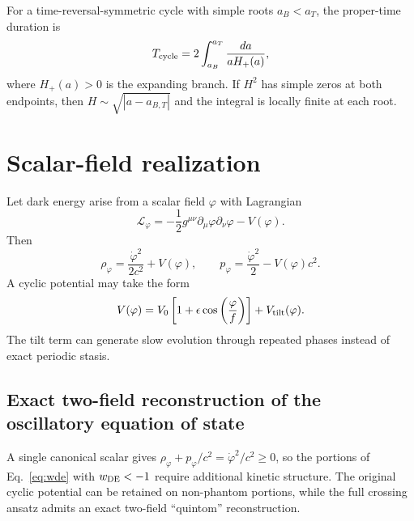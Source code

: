 \documentclass[11pt]{article}
\theoremstyle{remark}
\begin{document}
For a time-reversal-symmetric cycle with simple roots $a_B<a_T$, the proper-time duration is
\begin{equation}
 T_{\rm cycle}
 =2\int_{a_B}^{a_T}\frac{da}{aH_+(a)},
 \label{eq:cycle-period}
\end{equation}
where $H_+(a)>0$ is the expanding branch. If $H^2$ has simple zeros at both endpoints, then $H\sim\sqrt{|a-a_{B,T}|}$ and the integral is locally finite at each root.


\section{Scalar-field realization}
Let dark energy arise from a scalar field $\varphi$ with Lagrangian
\begin{equation}
    \mathcal L_\varphi=-\frac12 g^{\mu\nu}\partial_\mu\varphi\partial_\nu\varphi-V(\varphi).
\end{equation}
Then
\begin{equation}
    \rho_\varphi=\frac{\dot\varphi^2}{2c^2}+V(\varphi),
    \qquad
    p_\varphi=\frac{\dot\varphi^2}{2}-V(\varphi)c^2.
\end{equation}
A cyclic potential may take the form
\begin{equation}
    V(\varphi)=V_0\left[1+\epsilon\cos\left(\frac{\varphi}{f}\right)\right]+V_{\rm tilt}(\varphi).
\end{equation}
The tilt term can generate slow evolution through repeated phases instead of exact periodic stasis.


\subsection{Exact two-field reconstruction of the oscillatory equation of state}
A single canonical scalar gives $\rho_\varphi+p_\varphi/c^2=\dot\varphi^2/c^2\ge0$, so the portions of Eq.~\eqref{eq:wde} with $w_{\rm DE}<-1$ require additional kinetic structure. The original cyclic potential can be retained on non-phantom portions, while the full crossing ansatz admits an exact two-field ``quintom'' reconstruction.
\end{document}
